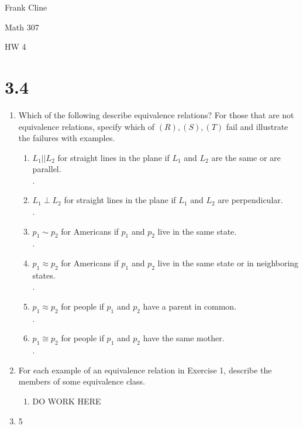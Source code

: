 \documentclass{article}
\begin{document}
\onehalfspacing
\hfill Frank Cline

\hfill Math 307

\hfill HW 4


\section*{3.4}
\begin{enumerate}
\item Which of the following describe equivalence relations? For those that are not equivalence relations, specify which of $(R),(S),(T)$ fail and illustrate the failures with examples.
	\begin{enumerate}
	\item $L_1||L_2$ for straight lines in the plane if $L_1$ and $L_2$ are the same or are parallel.\\
	.
	\item $L_1\perp L_2$ for straight lines in the plane if $L_1$ and $L_2$ are perpendicular.\\
	.
	\item $p_1\sim p_2$ for Americans if $p_1$ and $p_2$ live in the same state.\\
	.
	\item $p_1\approx p_2$ for Americans if $p_1$ and $p_2$ live in the same state or in neighboring 
	states.\\
	.
	\item $p_1\approx p_2$ for people if $p_1$ and $p_2$ have a parent in common.\\
	.
	\item $p_1\cong p_2$ for people if $p_1$ and $p_2$ have the same mother.\\
	.
	\end{enumerate}
\item For each example of an equivalence relation in Exercise 1, describe the members of some equivalence class.
	\begin{enumerate}
	\item  DO WORK HERE
	\end{enumerate}
\setcounter{enumi}{4}
\item 5


\end{enumerate}
\end{document}
